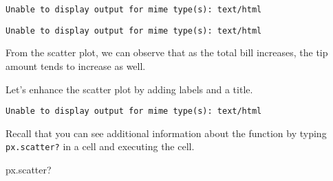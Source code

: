 \documentclass[
  letterpaper,
  DIV=11,
  numbers=noendperiod]{scrreprt}
\newenvironment{Shaded}{\begin{snugshade}}{\end{snugshade}}
\newcommand{\NormalTok}[1]{\textcolor[rgb]{0.00,0.23,0.31}{#1}}
\newcommand{\OperatorTok}[1]{\textcolor[rgb]{0.37,0.37,0.37}{#1}}
\newcommand{\StringTok}[1]{\textcolor[rgb]{0.13,0.47,0.30}{#1}}
\begin{document}
\begin{verbatim}
Unable to display output for mime type(s): text/html
\end{verbatim}

\begin{verbatim}
Unable to display output for mime type(s): text/html
\end{verbatim}

From the scatter plot, we can observe that as the total bill increases,
the tip amount tends to increase as well.

Let's enhance the scatter plot by adding labels and a title.

\begin{Shaded}
\end{Shaded}

\begin{verbatim}
Unable to display output for mime type(s): text/html
\end{verbatim}

Recall that you can see additional information about the function by
typing \texttt{px.scatter?} in a cell and executing the cell.

\begin{Shaded}
\begin{Highlighting}[]
\NormalTok{px.scatter?}
\end{Highlighting}
\end{Shaded}
\end{document}
